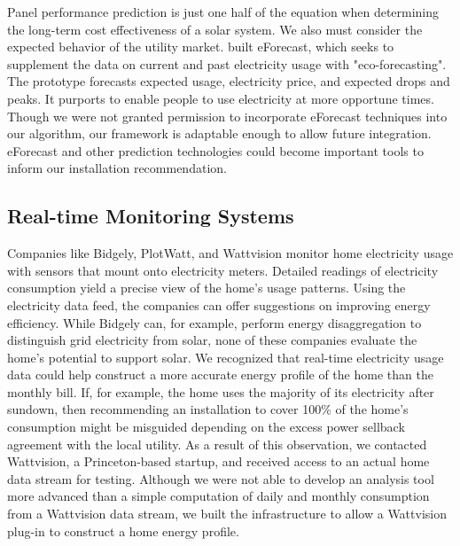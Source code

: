 \documentclass[pageno]{jpaper}
\begin{document}
Panel performance prediction is just one half of the equation when determining the long-term cost effectiveness of a solar system. We also must consider the expected behavior of the utility market. \cite{Kjeldskov:2015:EDE:2702123.2702318} built eForecast, which seeks to supplement the data on current and past electricity usage with "eco-forecasting". The prototype forecasts expected usage, electricity price, and expected drops and peaks. It purports to enable people to use electricity at more opportune times. Though we were not granted permission to incorporate eForecast techniques into our algorithm, our framework is adaptable enough to allow future integration. eForecast and other prediction technologies could become important tools to inform our installation recommendation.

\subsection{Real-time Monitoring Systems}
Companies like Bidgely, PlotWatt, and Wattvision monitor home electricity usage with sensors that mount onto electricity meters.  Detailed readings of electricity consumption yield a precise view of the home's usage patterns. Using the electricity data feed, the companies can offer suggestions on improving energy efficiency. While Bidgely can, for example, perform energy disaggregation to distinguish grid electricity from solar, none of these companies evaluate the home's potential to support solar. We recognized that real-time electricity usage data could help construct a more accurate energy profile of the home than the monthly bill. If, for example, the home uses the majority of its electricity after sundown, then recommending an installation to cover 100\% of the home's consumption might be misguided depending on the excess power sellback agreement with the local utility. As a result of this observation, we contacted Wattvision, a Princeton-based startup, and received access to an actual home data stream for testing. Although we were not able to develop an analysis tool more advanced than a simple computation of daily and monthly consumption from a Wattvision data stream, we built the infrastructure to allow a Wattvision plug-in to construct a home energy profile.
\end{document}
